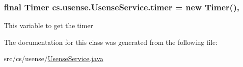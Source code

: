 \subsubsection[{timer}]{\setlength{\rightskip}{0pt plus 5cm}final Timer cs.\+usense.\+Usense\+Service.\+timer = new Timer()\hspace{0.3cm}{\ttfamily [static]}, {\ttfamily [private]}}\label{classcs_1_1usense_1_1_usense_service_a2840167e746fe3e7184721310b75f31d}
This variable to get the timer 

The documentation for this class was generated from the following file\+:\begin{DoxyCompactItemize}
\item 
src/cs/usense/\hyperlink{_usense_service_8java}{Usense\+Service.\+java}\end{DoxyCompactItemize}
